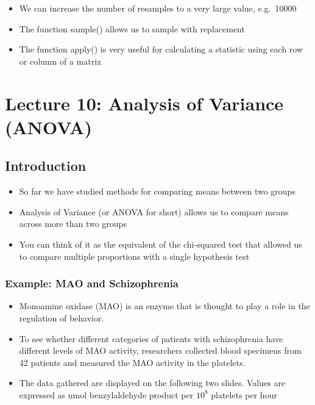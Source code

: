 \documentclass[
]{book}
\providecommand{\tightlist}{%
  \setlength{\itemsep}{0pt}\setlength{\parskip}{0pt}}
\begin{document}
\begin{itemize}
\tightlist
\item
  We can increase the number of resamples to a very large value, e.g.~10000
\item
  The function sample() allows us to sample with replacement
\item
  The function apply() is very useful for calculating a statistic using each row or column of a matrix
\end{itemize}

\hypertarget{lecture-10-analysis-of-variance-anova}{%
\chapter{Lecture 10: Analysis of Variance (ANOVA)}\label{lecture-10-analysis-of-variance-anova}}

\hypertarget{introduction-1}{%
\section{Introduction}\label{introduction-1}}

\begin{itemize}
\tightlist
\item
  So far we have studied methods for comparing means between two groups
\item
  Analysis of Variance (or ANOVA for short) allows us to compare means across more than two groups\\
\item
  You can think of it as the equivalent of the chi-squared test that allowed us to compare multiple proportions with a single hypothesis test
\end{itemize}

\hypertarget{example-mao-and-schizophrenia}{%
\subsection{Example: MAO and Schizophrenia}\label{example-mao-and-schizophrenia}}

\begin{itemize}
\tightlist
\item
  Monoamine oxidase (MAO) is an enzyme that is thought to play a role in the regulation of behavior.
\item
  To see whether different categories of patients with schizophrenia have different levels of MAO activity, researchers collected blood specimens from 42 patients and measured the MAO activity in the platelets.
\item
  The data gathered are displayed on the following two slides. Values are expressed as nmol benzylaldehyde product per \(10^8\) platelets per hour
\end{itemize}
\end{document}
